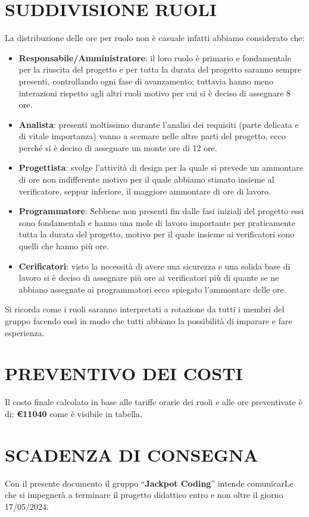 \documentclass[5pt]{article}
\begin{document}
\section{SUDDIVISIONE RUOLI}

La distribuzione delle ore per ruolo non è casuale infatti abbiamo considerato che:\\
\begin{itemize}
    \item \textbf{Responsabile/Amministratore}: il loro ruolo è primario e fondamentale per la riuscita del progetto e per tutta la durata del progetto saranno sempre presenti, controllando ogni fase di avanzamento; tuttavia hanno meno interazioni rispetto agli altri ruoli motivo per cui si è deciso di assegnare 8 ore.
    \item \textbf{Analista}: presenti moltissimo durante l’analisi dei requisiti (parte delicata e di vitale importanza) vanno a scemare nelle altre parti del progetto, ecco perché si è deciso di assegnare un monte ore di 12 ore.
    \item \textbf{Progettista}:  svolge l’attività di design per la quale si prevede un ammontare di ore non indifferente motivo per il quale abbiamo stimato insieme al verificatore, seppur inferiore, il maggiore ammontare di ore di lavoro.
    \item \textbf{Programmatore}: Sebbene non presenti fin dalle fasi iniziali del progetto essi sono fondamentali e hanno una mole di lavoro importante per praticamente tutta la durata del progetto, motivo per il quale insieme ai verificatori sono quelli che hanno più ore.
    \item \textbf{Cerificatori}: visto la necessità di avere una sicurezza e una solida base di lavoro si è deciso di assegnare più ore ai verificatori più di quante se ne abbiano assegnate ai programmatori ecco spiegato l’ammontare delle ore.
\end{itemize}

\medskip
Si ricorda come i ruoli saranno interpretati a rotazione da tutti i membri del gruppo facendo così in modo che tutti abbiano la possibilità di imparare e fare esperienza.

\section{PREVENTIVO DEI COSTI}
Il costo finale calcolato in base alle tariffe orarie dei ruoli e alle ore preventivate è di: \textbf{\euro 11040} come è visibile in tabella.

\section{SCADENZA DI CONSEGNA}
Con il presente documento il gruppo “\textbf{Jackpot Coding}” intende comunicarLe che si impegnerà a terminare il progetto didattico entro e non oltre il giorno 17/05/2024.
\end{document}
